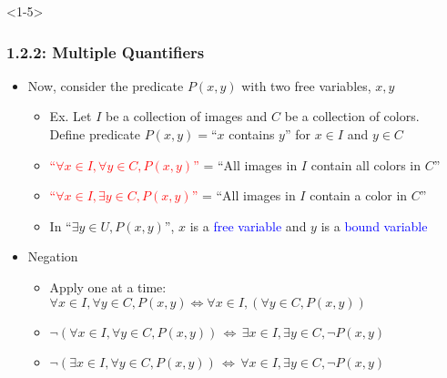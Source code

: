 \documentclass[10pt,english,aspectratio=169]{beamer}
\begin{document}
\begin{frame}<1-5> \frametitle{1.2.2: Multiple Quantifiers}



\begin{itemize}
\setlength\itemsep{6mm}
\item<1-> Now, consider the predicate $P(x,y)$ with two free variables, $x,y$ \vspace{1mm}
\begin{itemize}
 \setlength\itemsep{1.5mm}
 \item Ex. Let $I$ be a collection of images and $C$ be a collection of colors. \\ Define predicate $P(x,y)=$``$x$ contains $y$'' for $x\in I$ and $y\in C$ 
 \item<2-> \textcolor{red}{``$\forall x\!\in\! I, \forall y\!\in\! C, P(x,y)$''} = ``All images in $I$ contain all colors in $C$''
 \item<3-> \textcolor{red}{``$\forall x\!\in\! I, \exists y \!\in\! C, P(x,y)$''} = ``All images in $I$ contain a color in $C$''
 \item<4-> In ``$\exists y \in U, P(x,y)$'', $x$ is a \textcolor{blue}{free variable} and $y$ is a \textcolor{blue}{bound variable}
\end{itemize}

\item<5-> Negation \vspace{1mm}
\begin{itemize}
 \setlength\itemsep{1.5mm}
 \item Apply one at a time: $\forall x\!\in\! I, \forall y\!\in\! C, P(x,y) \Leftrightarrow \forall x\!\in\! I, \left(\forall y\!\in\! C, P(x,y)\right)$
 \item $\neg (\forall x\!\in\! I, \forall y\!\in\! C, P(x,y)) \,\Leftrightarrow\, \exists x\!\in\! I, \exists y\!\in\! C, \neg P(x,y)$
 \item $\neg (\exists x\!\in\! I, \forall y\!\in\! C, P(x,y)) \,\Leftrightarrow\, \forall x\!\in\! I, \exists y\!\in\! C, \neg P(x,y)$
\end{itemize}  

\end{itemize}



\end{frame}
\end{document}
